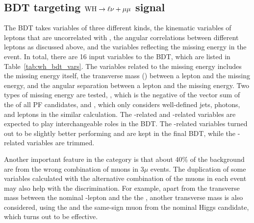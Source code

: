 \subsection{BDT targeting \texorpdfstring{$\mathrm{W}\mathrm{H} \to \ell\nu+\mu\mu$}{WH to 3l} signal}\label{subsec:WHlep_BDT}

The \WH BDT takes variables of three different kinds, the kinematic variables of leptons that are uncorrelated with \mmm,
the angular correlations between different leptons as discussed above, and the variables reflecting the missing energy in the event.
In total, there are 16 input variables to the BDT, which are listed in Table~\ref{tab:wh_bdt_vars}. 
The variables related to the missing energy includes the missing energy itself, 
the transverse mass (\MT) between a lepton and the missing energy, and the angular separation between a lepton and the missing energy.
Two types of missing energy are tested, \MET, which is the negative of the vector sum of the \pt of all PF candidates, 
and \MHT, which only considers well-defined jets, photons, and leptons in the similar calculation.
The \MET-related and \MHT-related variables are expected to play interchangeable roles in the BDT.
The \MHT-related variables turned out to be slightly better performing and are kept in the final BDT,
while the \MET-related variables are trimmed.

Another important feature in the \WH category is that about 40\% of the \WZ background are from the wrong combination of muons in 3$\mu$ events.  
The duplication of some variables calculated with the alternative combination of the muons in each event may also help with the discrimination.
For example, apart from the transverse mass between the nominal \PW-lepton and the the \MHT, 
another transverse mass is also considered, using the \MHT and the same-sign muon from the nominal Higgs candidate,
which turns out to be effective.


